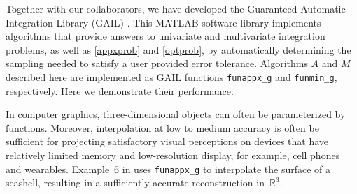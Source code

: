 \documentclass[review]{elsarticle}
\theoremstyle{definition}
\newcommand{\funappxg}{\texttt{funappx\_g}\xspace}
\newcommand{\funming}{\texttt{funmin\_g\xspace}}
\begin{document}
Together with our collaborators, we have developed the Guaranteed Automatic Integration Library (GAIL) \cite{ChoEtal15a}.  This MATLAB software library implements algorithms that provide answers to univariate and multivariate integration problems, as well as \eqref{appxprob} and \eqref{optprob}, by automatically determining the sampling needed to satisfy a user provided error tolerance. Algorithms $A$ and $M$ described here are implemented as GAIL functions  \funappxg{} and \funming, respectively.  Here we demonstrate their performance.

In computer graphics, three-dimensional objects can often be parameterized by
functions. Moreover, interpolation at low to medium accuracy is often
be sufficient for projecting satisfactory visual perceptions on devices that
have relatively limited memory and low-resolution display, for example,
cell phones and wearables. Example~6 in \cite[Chapter~3, Section~6]{Din15a} uses \funappxg{} to
interpolate the surface of a seashell, resulting in a sufficiently accurate
reconstruction in~$\mathbb{R}^3$.
\end{document}
